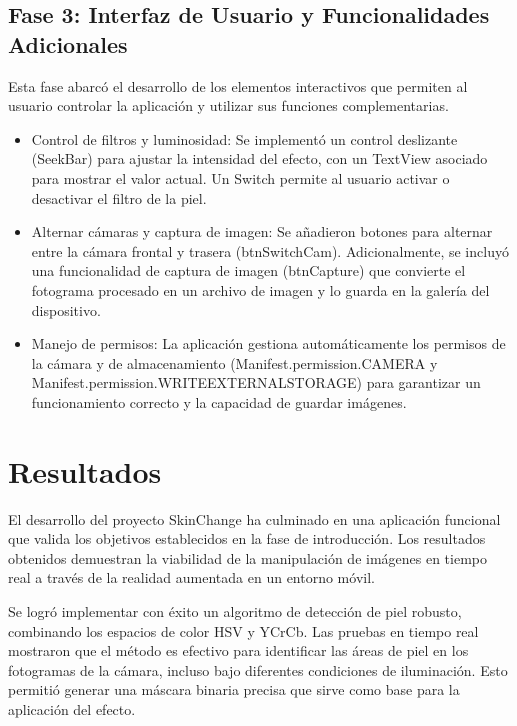 \documentclass[conference]{IEEEtran}
\begin{document}
\subsection{Fase 3: Interfaz de Usuario y Funcionalidades Adicionales}
Esta fase abarcó el desarrollo de los elementos interactivos que permiten al usuario controlar la aplicación y utilizar sus funciones complementarias.
\begin{itemize}
\item Control de filtros y luminosidad: Se implementó un control deslizante (SeekBar) para ajustar la intensidad del efecto, con un TextView asociado para mostrar el valor actual. Un Switch permite al usuario activar o desactivar el filtro de la piel\cite{c8}.
\item Alternar cámaras y captura de imagen: Se añadieron botones para alternar entre la cámara frontal y trasera (btnSwitchCam). Adicionalmente, se incluyó una funcionalidad de captura de imagen (btnCapture)\cite{c9} que convierte el fotograma procesado en un archivo de imagen y lo guarda en la galería del dispositivo.
\item Manejo de permisos: La aplicación gestiona automáticamente los permisos de la cámara y de almacenamiento (Manifest.permission.CAMERA y Manifest.permission.WRITEEXTERNALSTORAGE) para garantizar un funcionamiento correcto y la capacidad de guardar imágenes.
\end{itemize}

\section{Resultados}
El desarrollo del proyecto SkinChange ha culminado en una aplicación funcional que valida los objetivos establecidos en la fase de introducción. Los resultados obtenidos demuestran la viabilidad de la manipulación de imágenes en tiempo real a través de la realidad aumentada en un entorno móvil.

Se logró implementar con éxito un algoritmo de detección de piel robusto, combinando los espacios de color HSV y YCrCb. Las pruebas en tiempo real mostraron que el método es efectivo para identificar las áreas de piel en los fotogramas de la cámara, incluso bajo diferentes condiciones de iluminación. Esto permitió generar una máscara binaria precisa que sirve como base para la aplicación del efecto.
\end{document}
